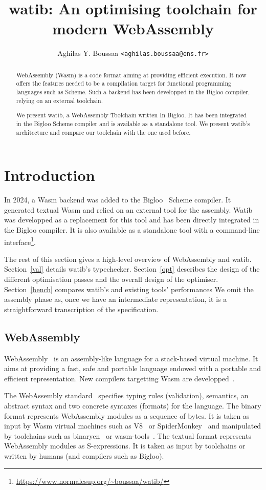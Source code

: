 \documentclass[a4paper,11pt]{article}
\author{Aghilas Y. Boussaa \texttt{<aghilas.boussaa@ens.fr>}}
\title{\textsf{watib}: An optimising toolchain for modern WebAssembly}
\begin{document}
\maketitle
\begin{abstract}
  WebAssembly (Wasm) is a code format aiming at providing efficient execution.
  It now offers the features needed to be a compilation target for functional
  programming languages such as Scheme. Such a backend has been developped in
  the Bigloo compiler, relying on an external toolchain.

  We present \textsf{watib}, a WebAssembly Toolchain written In Bigloo. It has
  been integrated in the Bigloo Scheme compiler and is available as a standalone
  tool. We present \textsf{watib}'s architecture and compare our toolchain with
  the one used before.
\end{abstract}

\section{Introduction}
In 2024, a Wasm backend was added to the Bigloo~\cite{Bigloo} Scheme compiler.
It generated textual Wasm and relied on an external tool for the assembly.
\textsf{Watib} was developped as a replacement for this tool and has been
directly integrated in the Bigloo compiler. It is also available as a standalone
tool with a command-line
interface\footnote{\url{https://www.normalesup.org/~boussaa/watib/}}.

The rest of this section gives a high-level overview of WebAssembly and
\textsf{watib}. Section~\ref{val} details \textsf{watib}'s typechecker.
Section~\ref{opt} describes the design of the different optimisation passes and
the overall design of the optimiser. Section~\ref{bench} compares
\textsf{watib}'s and existing tools' performances We omit the assembly phase as,
once we have an intermediate representation, it is a straightforward
transcription of the specification.
\subsection{WebAssembly}
WebAssembly~\cite{haas2017bringing} is an assembly-like language for a
stack-based virtual machine. It aims at providing a fast, safe and portable
language endowed with a portable and efficient representation. New compilers
targetting Wasm are developped~\cite{emscripten, kotlin, ocaml}.

The WebAssembly standard~\cite{WebAssemblyCoreSpecification3} specifies typing
rules (validation), semantics, an abstract syntax and two concrete syntaxes
(formats) for the language. The binary format represents WebAssembly modules as
a sequence of bytes. It is taken as input by Wasm virtual machines such as
V8~\cite{V8} or SpiderMonkey~\cite{SpiderMonkey} and manipulated by toolchains
such as binaryen~\cite{Binaryen} or wasm-tools~\cite{WasmTools}. The textual
format represents WebAssembly modules as S-expressions. It is taken as input by
toolchains or written by humans (and compilers such as Bigloo).
\end{document}
